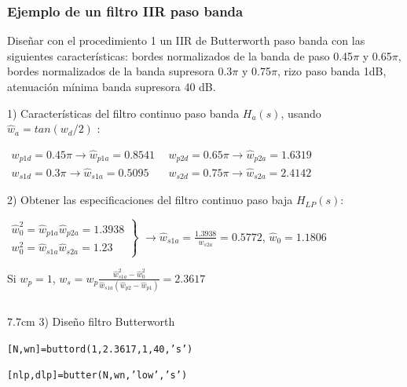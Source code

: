 \begin{frame}
\frametitle{Ejemplo de un filtro  IIR paso banda}
\footnotesize

\footnotesize
\color{olivegreen} Diseñar con el procedimiento 1 un IIR de Butterworth paso banda con las siguientes características: bordes normalizados de la banda de paso 0.45$\pi$ y 0.65$\pi$, bordes normalizados de la banda supresora 0.3$\pi$ y 0.75$\pi$, rizo paso banda 1dB, atenuación mínima banda supresora 40 dB.
\color{gray}
\vspace{0.1cm}

1)  Características del filtro continuo paso banda $H_a(s)$, usando $\hat w_{a}=tan(w_{d}/2)$  :

$\begin{array}{ll}w_{p1d}=0.45\pi \rightarrow \hat w_{p1a}=0.8541 &\:\: w_{p2d}=0.65\pi \rightarrow \hat w_{p2a}=1.6319 \\
w_{s1d}=0.3\pi \rightarrow \hat w_{s1a}=0.5095 &\:\: w_{s2d}=0.75\pi \rightarrow \hat w_{s2a}=2.4142
\end{array}$

\vspace{0.1cm}

2) Obtener las especificaciones del filtro continuo paso baja $H_{LP}(s)$:

\vspace{0.1cm}

$\left . \begin{array}{l}\hat w_0^2 =\hat w_{p1a}\hat w_{p2a}=1.3938\\w_0^2 =\hat w_{s1a}\hat w_{s2a}=1.23
\end{array} \right \}$ $\rightarrow \hat w_{s1a}=\frac{1.3938}{w_{s2a}}=0.5772$, $\hat w_0=1.1806$


\hspace{0.25cm}Si $w_p=1$, $w_{s}=w_p\frac{\hat w_{s1a}^2-\hat w_0^2}{\hat w_{s1a} (\hat w_{p2}-\hat w_{p1})}=2.3617$


\vspace{0.1cm}

\begin{columns}[T]
 \hspace{0.2cm}\begin{column}{7.7cm}
3) Diseño filtro Butterworth

\vspace{0.1cm}

\hspace{0.25cm}\texttt{[N,wn]=buttord(1,2.3617,1,40,'s')}

\hspace{0.25cm}\texttt{[nlp,dlp]=butter(N,wn,'low','s')}


\end{column}
\end{columns}
\end{frame}
